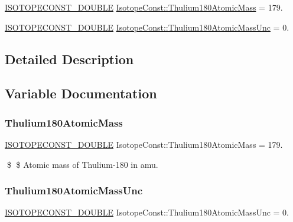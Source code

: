 \begin{DoxyCompactItemize}
\item 
\mbox{\hyperlink{group___isotope_const-_macros_ga8f45a7272ce02c0b4c65c44636ed719a}{I\+S\+O\+T\+O\+P\+E\+C\+O\+N\+S\+T\+\_\+\+D\+O\+U\+B\+LE}} \mbox{\hyperlink{group___isotope_const-_thulium-_tm180_ga06952cd920f13496289360b0709df9df}{Isotope\+Const\+::\+Thulium180\+Atomic\+Mass}} = 179.
\item 
\mbox{\hyperlink{group___isotope_const-_macros_ga8f45a7272ce02c0b4c65c44636ed719a}{I\+S\+O\+T\+O\+P\+E\+C\+O\+N\+S\+T\+\_\+\+D\+O\+U\+B\+LE}} \mbox{\hyperlink{group___isotope_const-_thulium-_tm180_ga6a78de081a95b216699e104d56e9635a}{Isotope\+Const\+::\+Thulium180\+Atomic\+Mass\+Unc}} = 0.
\end{DoxyCompactItemize}


\subsection{Detailed Description}


\subsection{Variable Documentation}
\mbox{\label{group___isotope_const-_thulium-_tm180_ga06952cd920f13496289360b0709df9df}} 
\subsubsection{\texorpdfstring{Thulium180\+Atomic\+Mass}{Thulium180AtomicMass}}
{\footnotesize\ttfamily \mbox{\hyperlink{group___isotope_const-_macros_ga8f45a7272ce02c0b4c65c44636ed719a}{I\+S\+O\+T\+O\+P\+E\+C\+O\+N\+S\+T\+\_\+\+D\+O\+U\+B\+LE}} Isotope\+Const\+::\+Thulium180\+Atomic\+Mass = 179.}

\$ \$ Atomic mass of Thulium-\/180 in amu. \mbox{\label{group___isotope_const-_thulium-_tm180_ga6a78de081a95b216699e104d56e9635a}} 
\subsubsection{\texorpdfstring{Thulium180\+Atomic\+Mass\+Unc}{Thulium180AtomicMassUnc}}
{\footnotesize\ttfamily \mbox{\hyperlink{group___isotope_const-_macros_ga8f45a7272ce02c0b4c65c44636ed719a}{I\+S\+O\+T\+O\+P\+E\+C\+O\+N\+S\+T\+\_\+\+D\+O\+U\+B\+LE}} Isotope\+Const\+::\+Thulium180\+Atomic\+Mass\+Unc = 0.}

